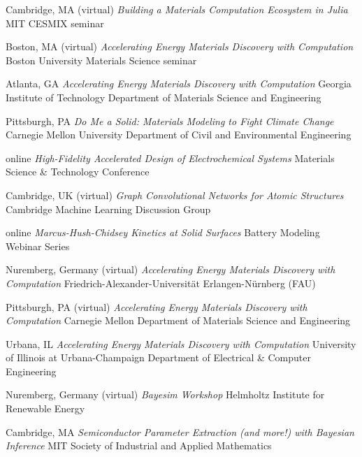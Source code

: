 \vspace{\talksep}
\datedsubsection{}
    {Cambridge, MA (virtual)}
    {\textit{Building a Materials Computation Ecosystem in Julia}}
    {MIT CESMIX seminar}

\vspace{\talksep}
\datedsubsection{}
    {Boston, MA (virtual)}
    {\textit{Accelerating Energy Materials Discovery with Computation}}
    {Boston University Materials Science seminar}

\vspace{\talkyearsep}
    {Atlanta, GA}
    {\textit{Accelerating Energy Materials Discovery with Computation}}
    {Georgia Institute of Technology Department of Materials Science and Engineering}

\vspace{\talksep}
\datedsubsection{}
    {Pittsburgh, PA}
    {\textit{Do Me a Solid: Materials Modeling to Fight Climate Change}}
    {Carnegie Mellon University Department of Civil and Environmental Engineering}

\vspace{\talkyearsep}
    {online}
    {\textit{High-Fidelity Accelerated Design of Electrochemical Systems}}
    {Materials Science \& Technology Conference}

\vspace{\talksep}
\datedsubsection{}
    {Cambridge, UK (virtual)}
    {\textit{Graph Convolutional Networks for Atomic Structures}}
    {Cambridge Machine Learning Discussion Group}

\vspace{\talksep}
\datedsubsection{}
    {online}
    {\textit{Marcus-Hush-Chidsey Kinetics at Solid Surfaces}}
    {Battery Modeling Webinar Series}

\vspace{\talksep}
\datedsubsection{}
    {Nuremberg, Germany (virtual)}
    {\textit{Accelerating Energy Materials Discovery with Computation}}
    {Friedrich-Alexander-Universit\"at Erlangen-N\"urnberg (FAU)}

\vspace{\talksep}
\datedsubsection{}
    {Pittsburgh, PA (virtual)}
    {\textit{Accelerating Energy Materials Discovery with Computation}}
    {Carnegie Mellon Department of Materials Science and Engineering}

\vspace{\talksep}
\datedsubsection{}
    {Urbana, IL}
    {\textit{Accelerating Energy Materials Discovery with Computation}}
    {University of Illinois at Urbana-Champaign Department of Electrical \& Computer Engineering}

\vspace{\talkyearsep}
    {Nuremberg, Germany (virtual)}
    {\textit{Bayesim Workshop}}
    {Helmholtz Institute for Renewable Energy}

\vspace{\talksep}
    {Cambridge, MA}
    {\textit{Semiconductor Parameter Extraction (and more!) with Bayesian Inference}}
    {MIT Society of Industrial and Applied Mathematics}

